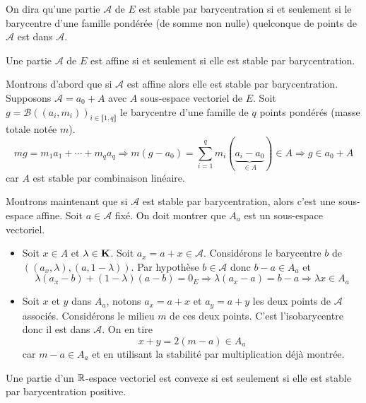 \begin{defi}
 On dira qu'une partie $\mathcal A$ de $E$ est stable par barycentration si et seulement si le barycentre d'une famille pondérée (de somme non nulle) quelconque de points de $\mathcal A$ est dans $\mathcal A$.
\end{defi}
\begin{prop}
 Une partie $\mathcal A$ de $E$ est affine si et seulement si elle est stable par barycentration.
\end{prop}
\begin{demo}
Montrons d'abord que si $\mathcal A$ est affine alors elle est stable par barycentration.\newline 
Supposons $\mathcal A = a_0 + A$ avec $A$ sous-espace vectoriel de $E$. Soit $g = \mathcal{B}((a_i,m_i))_{i\in\llbracket 1,q \rrbracket}$ le barycentre d'une famille de $q$ points pondérés (masse totale notée $m$). 
\[
 mg = m_1a_1 + \cdots +m_qa_q \Rightarrow m(g-a_0) = \sum_{i=1}^{q}m_i(\underset{ \in A}{\underbrace{a_i - a_0}}) \in A \Rightarrow g \in a_0 + A
\]
car $A$ est stable par combinaison linéaire.

Montrons maintenant que si $\mathcal{A}$ est stable par barycentration, alors c'est une sous-espace affine.\newline
Soit $a\in \mathcal{A}$ fixé. On doit montrer que $A_a$ est un sous-espace vectoriel.
\begin{itemize}
 \item Soit $x\in A$ et $\lambda \in \mathbf{K}$. Soit $a_x=a+x\in \mathcal A$. Considérons le barycentre $b$ de $\left((a_x,\lambda), (a,1-\lambda) \right)$. Par hypothèse $b\in \mathcal A$ donc $b-a\in A_a$ et 
\begin{displaymath}
 \lambda(a_x-b)+(1-\lambda)(a-b)=0_E
\Rightarrow
\lambda(a_x -a) = b-a
\Rightarrow \lambda x \in A_a
\end{displaymath}
 \item Soit $x$ et $y$ dans $A_a$, notons $a_x=a+x$ et $a_y=a+y$ les deux points de $\mathcal A$ associés. Considérons le milieu $m$ de ces deux points. C'est l'isobarycentre donc il est dans $\mathcal A$. On en tire
\begin{displaymath}
 x+y = 2(m-a)\in A_a
\end{displaymath}
car $m-a\in A_a$ et en utilisant la stabilité par multiplication déjà montrée.
\end{itemize}
\end{demo}
\begin{defi}
 Une partie d'un $\mathbb{R}$-espace vectoriel est convexe si est seulement si elle est stable par barycentration positive.
\end{defi}

